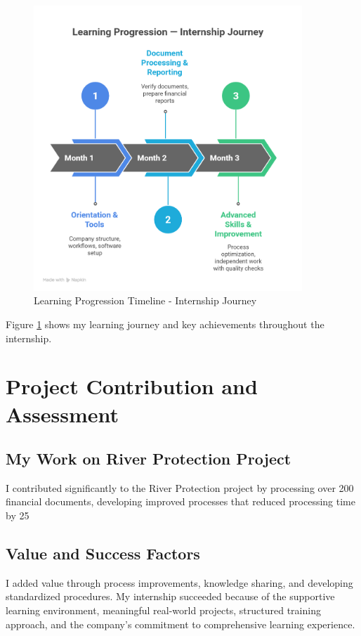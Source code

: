 \begin{figure}[H]
    \centering
    \includegraphics[width=0.9\textwidth]{assets/images/learning_timeline_chart.png}
    \caption{Learning Progression Timeline - Internship Journey}
    \label{fig:learning_timeline_chart}
\end{figure}

Figure \ref{fig:learning_timeline_chart} shows my learning journey and key achievements throughout the internship.

\section{Project Contribution and Assessment}

\subsection{My Work on River Protection Project}
I contributed significantly to the River Protection project by processing over 200 financial documents, developing improved processes that reduced processing time by 25%

\subsection{Value and Success Factors}
I added value through process improvements, knowledge sharing, and developing standardized procedures. My internship succeeded because of the supportive learning environment, meaningful real-world projects, structured training approach, and the company's commitment to comprehensive learning experience.

